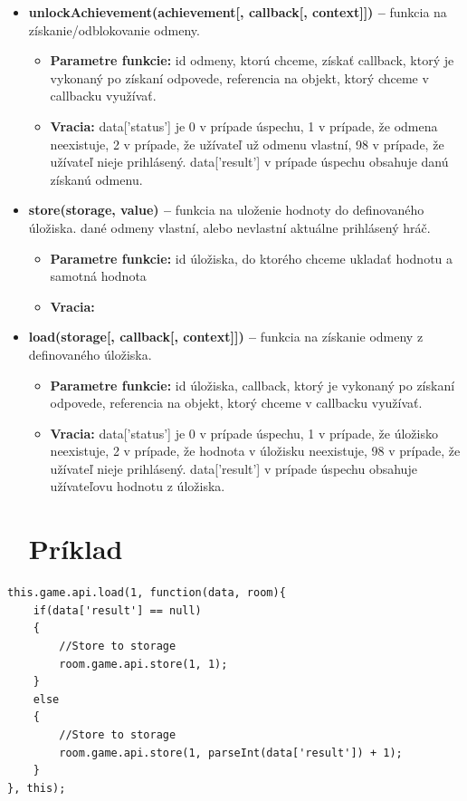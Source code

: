 \begin{itemize}
\item \textbf{unlockAchievement(achievement[, callback[, context]]) –} funkcia na získanie/odblokovanie odmeny.
\begin{itemize}
\item \textbf{Parametre funkcie:} id odmeny, ktorú chceme, získať callback, ktorý je vykonaný po získaní odpovede, referencia na objekt, ktorý chceme v callbacku využívať. 
\item \textbf{Vracia:} data['status'] je 0 v prípade úspechu, 1 v prípade, že odmena neexistuje, 2 v prípade, že užívateľ už odmenu vlastní, 98 v prípade, že užívateľ nieje prihlásený. data['result'] v prípade úspechu obsahuje danú získanú odmenu.
\end{itemize}

\item \textbf{store(storage, value) –} funkcia na uloženie hodnoty do definovaného úložiska.
dané odmeny vlastní, alebo nevlastní aktuálne prihlásený hráč.
\begin{itemize}
\item \textbf{Parametre funkcie:} id úložiska, do ktorého chceme ukladať hodnotu a samotná hodnota 
\item \textbf{Vracia:}
\end{itemize}

\item \textbf{load(storage[, callback[, context]]) –} funkcia na získanie odmeny z definovaného úložiska.
\begin{itemize}
\item \textbf{Parametre funkcie:} id úložiska, callback, ktorý je vykonaný po získaní odpovede, referencia na objekt, ktorý chceme v callbacku využívať. 
\item \textbf{Vracia:} data['status'] je 0 v prípade úspechu, 1 v prípade, že úložisko neexistuje, 2 v prípade, že hodnota v úložisku neexistuje, 98 v prípade, že užívateľ nieje prihlásený. data['result'] v prípade úspechu obsahuje užívateľovu hodnotu z úložiska.
\end{itemize}

\section{Príklad}
\end{itemize}
\begin{lstlisting}[]
this.game.api.load(1, function(data, room){
    if(data['result'] == null)
    {
        //Store to storage
        room.game.api.store(1, 1);
    }
    else
    {
        //Store to storage
        room.game.api.store(1, parseInt(data['result']) + 1);
    }
}, this);
\end{lstlisting}

